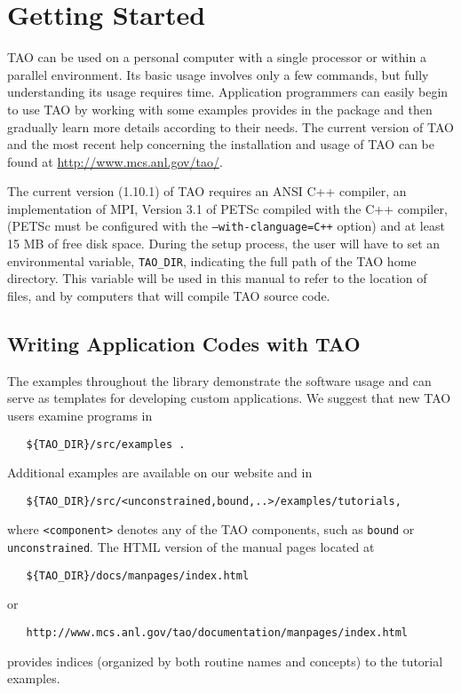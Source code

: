 \chapter{Getting Started}
\label{chapter:intro_tao}

TAO can be used on a personal
computer with a single processor or within a parallel environment.  
Its basic usage involves only a few commands, but fully 
understanding its usage requires time.
Application programmers can easily begin to use TAO by working with 
some examples provides in the package
and then gradually learn more details according to
their needs.  The current version of TAO and the most recent help 
concerning the installation and usage of TAO can be found at  
\url{http://www.mcs.anl.gov/tao/}.

The current version (1.10.1) of TAO requires an ANSI C++ compiler, 
an implementation of MPI, Version 3.1 of PETSc compiled with the C++ 
compiler, (PETSc must be configured with the \texttt{--with-clanguage=C++}
option) and at 
least 15 MB of free disk space.
During the setup process, the user will have to set an environmental
variable, \texttt{TAO\_DIR}, indicating the full path of 
the TAO home directory.
This variable will be used in this
manual to refer to the location of files, and by computers that
will compile TAO source code.

\section{Writing Application Codes with TAO}

The examples throughout the library demonstrate the software usage and
can serve as templates for developing custom applications.  We suggest
that new TAO users examine programs in
\begin{verbatim}
   ${TAO_DIR}/src/examples .
\end{verbatim} %
\noindent
Additional examples are available on our website and in
\begin{verbatim}
   ${TAO_DIR}/src/<unconstrained,bound,..>/examples/tutorials,
\end{verbatim} 
\noindent
where \texttt{<component>}
denotes any of the TAO components, such as 
\texttt{bound} or \texttt{unconstrained}.
The HTML version of the manual pages located at
\begin{verbatim}
   ${TAO_DIR}/docs/manpages/index.html
\end{verbatim} %
\noindent
or
\begin{verbatim}
   http://www.mcs.anl.gov/tao/documentation/manpages/index.html
\end{verbatim}
\noindent
provides indices (organized by both routine names and concepts) to the
tutorial examples.

